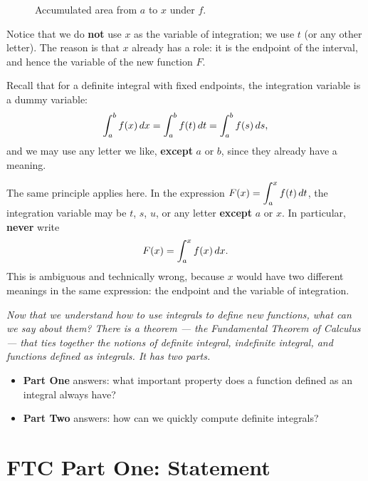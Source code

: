\begin{figure}[ht]
  \centering
  
  \caption{Accumulated area from $a$ to $x$ under $f$.}
  \label{fig:accumulation-function}
\end{figure}

\begin{remark}[Warning]
Notice that we do \textbf{not} use $x$ as the variable of integration; we use $t$ (or any other letter).  The reason is that $x$ already has a role: it is the endpoint of the interval, and hence the variable of the new function $F$.

Recall that for a definite integral with fixed endpoints, the integration variable is a dummy variable:
\[
  \int_{a}^{b} f(x)\,dx = \int_{a}^{b} f(t)\,dt = \int_{a}^{b} f(s)\,ds,
\]
and we may use any letter we like, \textbf{except} $a$ or $b$, since they already have a meaning.

The same principle applies here.  In the expression $F(x) = \displaystyle\int_{a}^{x} f(t)\,dt$, the integration variable may be $t$, $s$, $u$, or any letter \textbf{except} $a$ or $x$.  In particular, \textbf{never} write
\[
  F(x) = \int_{a}^{x} f(x)\,dx.
\]
This is ambiguous and technically wrong, because $x$ would have two different meanings in the same expression: the endpoint and the variable of integration.
\end{remark}

\textit{Now that we understand how to use integrals to define new functions, what can we say about them?  There is a theorem --- the Fundamental Theorem of Calculus --- that ties together the notions of definite integral, indefinite integral, and functions defined as integrals.  It has two parts.}

\begin{itemize}
  \item \textbf{Part One} answers: what important property does a function defined as an integral always have?
  \item \textbf{Part Two} answers: how can we quickly compute definite integrals?
\end{itemize}

\section{FTC Part One: Statement}
\label{sec:8.3}

